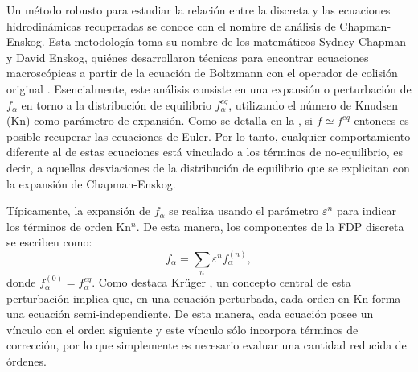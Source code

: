 Un m\'etodo robusto para estudiar la relaci\'on entre la \lbe{} discreta y las ecuaciones hidrodin\'amicas recuperadas se conoce con el nombre de an\'alisis de Chapman-Enskog. Esta metodolog\'ia toma su nombre de los matem\'aticos Sydney Chapman y David Enskog, qui\'enes desarrollaron t\'ecnicas para encontrar ecuaciones macrosc\'opicas a partir de la ecuaci\'on de Boltzmann con el operador de colisi\'on original \cite{chapman_mathematical_1970}. Esencialmente, este an\'alisis consiste en una expansi\'on o perturbaci\'on de $f_{\alpha}$ en torno a la distribuci\'on de equilibrio $f_{\alpha}^{eq}$, utilizando el n\'umero de Knudsen (Kn) como par\'ametro de expansi\'on. Como se detalla en la , si $f \simeq f^{eq}$ entonces es posible recuperar las ecuaciones de Euler. Por lo tanto, cualquier comportamiento diferente al de estas ecuaciones est\'a vinculado a los t\'erminos de no-equilibrio, es decir, a aquellas desviaciones de la distribuci\'on de equilibrio que se explicitan con la expansi\'on de Chapman-Enskog.

T\'ipicamente, la expansi\'on de $f_{\alpha}$ se realiza usando el par\'ametro $\varepsilon^n$ para indicar los t\'erminos de orden Kn$^n$. De esta manera, los componentes de la FDP discreta se escriben como:
\begin{equation}
	f_{\alpha} = \sum_{n} \varepsilon^{n} f_{\alpha}^{(n)},
	\label{eq:f_che_gral}
\end{equation}
donde $f_{\alpha}^{(0)} = f_{\alpha}^{eq}$. Como destaca Kr\"uger \cite{kruger_lattice_2017}, un concepto central de esta perturbaci\'on implica que, en una ecuaci\'on perturbada, cada orden en Kn forma una ecuaci\'on semi-independiente. De esta manera, cada ecuaci\'on posee un v\'inculo con el orden siguiente y este v\'inculo s\'olo incorpora t\'erminos de correcci\'on, por lo que simplemente es necesario evaluar una cantidad reducida de \'ordenes. 

